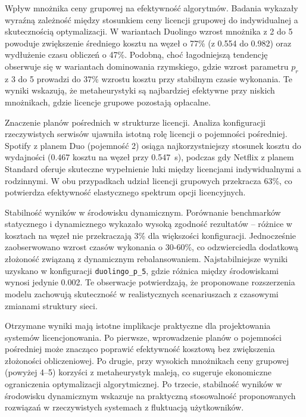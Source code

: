 Wpływ mnożnika ceny grupowej na efektywność algorytmów. Badania wykazały wyraźną zależność między stosunkiem ceny licencji grupowej do indywidualnej a skutecznością optymalizacji. W wariantach Duolingo wzrost mnożnika z 2 do 5 powoduje zwiększenie średniego kosztu na węzeł o 77\% (z 0.554 do 0.982) oraz wydłużenie czasu obliczeń o 47\%. Podobną, choć łagodniejszą tendencję obserwuje się w wariantach dominowania rzymskiego, gdzie wzrost parametru $p_r$ z 3 do 5 prowadzi do 37\% wzrostu kosztu przy stabilnym czasie wykonania. Te wyniki wskazują, że metaheurystyki są najbardziej efektywne przy niskich mnożnikach, gdzie licencje grupowe pozostają opłacalne.

Znaczenie planów pośrednich w strukturze licencji. Analiza konfiguracji rzeczywistych serwisów ujawniła istotną rolę licencji o pojemności pośredniej. Spotify z planem Duo (pojemność 2) osiąga najkorzystniejszy stosunek kosztu do wydajności (0.467 kosztu na węzeł przy \SI{0.547}{\second}), podczas gdy Netflix z planem Standard oferuje skuteczne wypełnienie luki między licencjami indywidualnymi a rodzinnymi. W obu przypadkach udział licencji grupowych przekracza 63\%, co potwierdza efektywność elastycznego spektrum opcji licencyjnych.

Stabilność wyników w środowisku dynamicznym. Porównanie benchmarków statycznego i dynamicznego wykazało wysoką zgodność rezultatów -- różnice w kosztach na węzeł nie przekraczają 3\% dla większości konfiguracji. Jednocześnie zaobserwowano wzrost czasów wykonania o 30-60\%, co odzwierciedla dodatkową złożoność związaną z dynamicznym rebalansowaniem. Najstabilniejsze wyniki uzyskano w konfiguracji \texttt{duolingo\_p\_5}, gdzie różnica między środowiskami wynosi jedynie 0.002. Te obserwacje potwierdzają, że proponowane rozszerzenia modelu zachowują skuteczność w realistycznych scenariuszach z czasowymi zmianami struktury sieci.

Otrzymane wyniki mają istotne implikacje praktyczne dla projektowania systemów licencjonowania. Po pierwsze, wprowadzenie planów o pojemności pośredniej może znacząco poprawić efektywność kosztową bez zwiększenia złożoności obliczeniowej. Po drugie, przy wysokich mnożnikach ceny grupowej (powyżej 4--5) korzyści z metaheurystyk maleją, co sugeruje ekonomiczne ograniczenia optymalizacji algorytmicznej. Po trzecie, stabilność wyników w środowisku dynamicznym wskazuje na praktyczną stosowalność proponowanych rozwiązań w rzeczywistych systemach z fluktuacją użytkowników.
